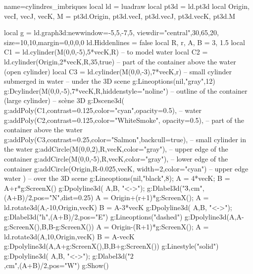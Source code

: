 \begin{luadraw}{name=cylindres_imbriques}
local ld = luadraw
local pt3d = ld.pt3d
local Origin, vecI, vecJ, vecK, M = pt3d.Origin, pt3d.vecI, pt3d.vecJ, pt3d.vecK, pt3d.M

local g = ld.graph3d:new{window={-5,5,-7,5}, viewdir={"central",30,65,20},
    size={10,10},margin={0,0,0,0}}
ld.Hiddenlines = false
local R, r, A, B = 3, 1.5
local C1 = ld.cylinder(M(0,0,-5),5*vecK,R)  -- to model water
local C2 = ld.cylinder(Origin,2*vecK,R,35,true) -- part of the container above the water (open cylinder)
local C3 = ld.cylinder(M(0,0,-3),7*vecK,r) -- small cylinder submerged in water
-- under the 3D scene
g:Lineoptions(nil,"gray",12)
g:Dcylinder(M(0,0,-5),7*vecK,R,{hiddenstyle="noline"}) -- outline of the container (large cylinder)
-- scène 3D
g:Dscene3d(
        g:addPoly(C1,{contrast=0.125,color="cyan",opacity=0.5}), -- water
        g:addPoly(C2,{contrast=0.125,color="WhiteSmoke", opacity=0.5}), -- part of the container above the water
        g:addPoly(C3,{contrast=0.25,color="Salmon",backcull=true}), -- small cylinder in the water
        g:addCircle(M(0,0,2),R,vecK,{color="gray"}), -- upper edge of the container
        g:addCircle(M(0,0,-5),R,vecK,{color="gray"}), -- lower edge of the container
        g:addCircle(Origin,R-0.025,vecK, {width=2,color="cyan"}) -- upper edge water
        )
-- over the 3D scene
g:Lineoptions(nil,"black",8); A = 4*vecK; B = A+r*g:ScreenX()
g:Dpolyline3d( {A,B}, "<->"); g:Dlabel3d("$3\\,$cm",(A+B)/2,{pos="N",dist=0.25})
A = Origin+(r+1)*g:ScreenX(); A = ld.rotate3d(A,-10,{Origin,vecK})
B = A-3*vecK
g:Dpolyline3d( {A,B}, "<->"); g:Dlabel3d("h",(A+B)/2,{pos="E"})
g:Lineoptions("dashed")
g:Dpolyline3d({{A,A-g:ScreenX()},{B,B-g:ScreenX()}})
A = Origin-(R+1)*g:ScreenX(); A = ld.rotate3d(A,10,{Origin,vecK})
B = A-vecK
g:Dpolyline3d({{A,A+g:ScreenX()},{B,B+g:ScreenX()}})
g:Linestyle("solid")
g:Dpolyline3d( {A,B}, "<->"); g:Dlabel3d("$2$\\,cm",(A+B)/2,{pos="W"})
g:Show()
\end{luadraw}
